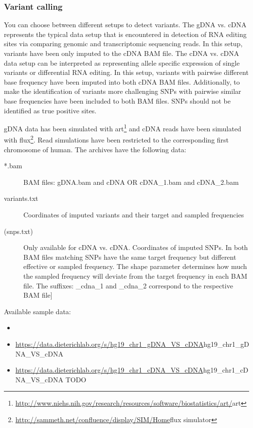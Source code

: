 \documentclass[10pt,a4paper]{article}
\begin{document}
\subsubsection{Variant calling}
You can choose between different setups to detect variants. The gDNA vs. cDNA represents the typical 
data setup that is encountered in detection of RNA editing sites via comparing genomic and transcriptomic 
sequencing reads. In this setup, variants have been only imputed to the cDNA BAM file. 
The cDNA vs. cDNA data setup can be interpreted as representing allele specific expression of single 
variants or differential RNA editing. In this setup, variants with pairwise different base frequency 
have been imputed into both cDNA BAM files. Additionally, to make the identification of variants more 
challenging SNPs with pairwise similar base frequencies have been included to both BAM files. 
SNPs should not be identified as true positive sites.

gDNA data has been simulated with
art\footnote{\url{http://www.niehs.nih.gov/research/resources/software/biostatistics/art/}{art}}
and cDNA reads have been simulated with
flux\footnote{\url{http://sammeth.net/confluence/display/SIM/Home}{flux simulator}}. Read
simulations have been restricted to the corresponding first chromosome of human.
The archives have the following data:
\begin{description}
  \item[*.bam] BAM files: gDNA.bam and cDNA OR cDNA\_1.bam and cDNA\_2.bam
  \item[variants.txt] Coordinates of imputed variants and their target and sampled frequencies
  \item[(snps.txt)] Only available for cDNA vs. cDNA. Coordinates of imputed SNPs. In both
  BAM files matching SNPs have the same target frequency but different effective or sampled
  frequency. The shape parameter determines how much the sampled frequency will deviate from the
  target frequency in each BAM file. The suffixes: \_cdna\_1 and \_cdna\_2 correspond to the
  respective BAM file]
\end{description}
Available sample data:
\begin{itemize}
  \item
  \item \url{https://data.dieterichlab.org/s/hg19_chr1_gDNA_VS_cDNA}{hg19\_chr1\_gDNA\_VS\_cDNA}
  \item \url{https://data.dieterichlab.org/s/hg19_chr1_cDNA_VS_cDNA}{hg19\_chr1\_cDNA\_VS\_cDNA} TODO
\end{itemize}
\end{document}

